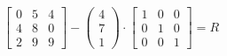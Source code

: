 \documentclass[10pt]{article}
\begin{document}
\begin{equation*}
\begin{bmatrix}
0 & 5 & 4 \\
4 & 8 & 0 \\
2 & 9 & 9 
\end{bmatrix}-\begin{pmatrix}
4 \\
7 \\
1 
\end{pmatrix}\cdot\begin{bmatrix}
1 & 0 & 0 \\
0 & 1 & 0 \\
0 & 0 & 1 
\end{bmatrix}=R
\end{equation*}
\end{document}
